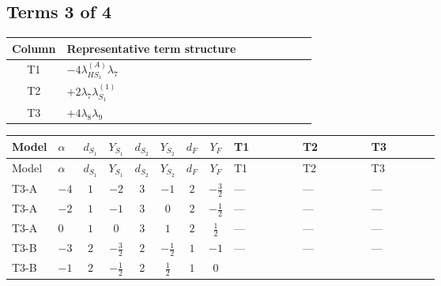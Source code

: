 \documentclass[8pt]{article}
\begin{document}
\begin{landscape}
\subsection*{Terms 3 of 4}
\begin{center}
\begin{tabular}{@{}c >{\raggedright\arraybackslash}p{0.82\linewidth}@{}}
\toprule
Column & Representative term structure \\
\midrule
T1 & \(\displaystyle -4 {\lambda_{HS_1}^{(A)}} {\lambda_{7}}\) \\
\midrule
T2 & \(\displaystyle +2 {\lambda_{7}} {\lambda_{S_1}^{(1)}}\) \\
\midrule
T3 & \(\displaystyle +4 {\lambda_{8}} {\lambda_{9}}\) \\
\midrule
\bottomrule
\end{tabular}
\end{center}
\smallskip
\tiny
\begin{longtable}{@{}llcccccc >{\raggedright\arraybackslash}p{0.21\linewidth} >{\raggedright\arraybackslash}p{0.21\linewidth} >{\raggedright\arraybackslash}p{0.21\linewidth}@{}}
\toprule
Model & $\alpha$ & $d_{S_1}$ & $Y_{S_1}$ & $d_{S_2}$ & $Y_{S_2}$ & $d_F$ & $Y_F$ & T1 & T2 & T3 \\
\midrule
\endfirsthead
\toprule
Model & $\alpha$ & $d_{S_1}$ & $Y_{S_1}$ & $d_{S_2}$ & $Y_{S_2}$ & $d_F$ & $Y_F$ & T1 & T2 & T3 \\
\midrule
\endhead
T3-A & $-4$ & $1$ & $-2$ & $3$ & $-1$ & $2$ & $-\frac{3}{2}$ & --- & --- & --- \\
\midrule
T3-A & $-2$ & $1$ & $-1$ & $3$ & $0$ & $2$ & $-\frac{1}{2}$ & --- & --- & --- \\
\midrule
T3-A & $0$ & $1$ & $0$ & $3$ & $1$ & $2$ & $\frac{1}{2}$ & --- & --- & --- \\
\midrule
T3-B & $-3$ & $2$ & $-\frac{3}{2}$ & $2$ & $-\frac{1}{2}$ & $1$ & $-1$ & --- & --- & --- \\
\midrule
T3-B & $-1$ & $2$ & $-\frac{1}{2}$ & $2$ & $\frac{1}{2}$ & $1$ & $0$ & \scriptsize\adjustbox{max width=\linewidth}{$\begin{gathered} -4 {\lambda_{HS_1}^{(A)}} {\lambda_{7}}\end{gathered}$} & \scriptsize\adjustbox{max width=\linewidth}{$\begin{gathered} +2 {\lambda_{7}} {\lambda_{S_1}^{(1)}}\end{gathered}$} & \scriptsize\adjustbox{max width=\linewidth}{$\begin{gathered} +4 {\lambda_{8}} {\lambda_{9}}\end{gathered}$} \\

\end{longtable}
\end{landscape}
\end{document}
